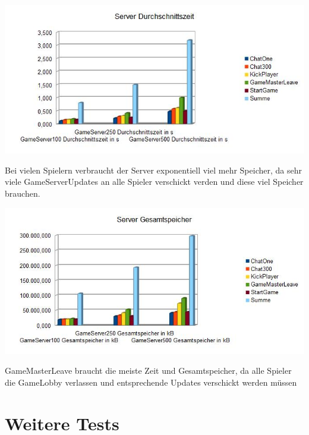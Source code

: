 \documentclass[a4paper]{article}
\begin{document}
\begin{center}
\includegraphics[scale=0.75]{9}
\end{center}
Bei vielen Spielern verbraucht der Server exponentiell viel mehr Speicher, da sehr viele GameServerUpdates an alle Spieler verschickt verden und diese viel Speicher brauchen.

\begin{center}
\includegraphics[scale=0.75]{10}
\end{center}
GameMasterLeave braucht die meiste Zeit und Gesamtspeicher, da alle Spieler die GameLobby verlassen und entsprechende Updates verschickt werden müssen


\section{Weitere Tests}
\end{document}
